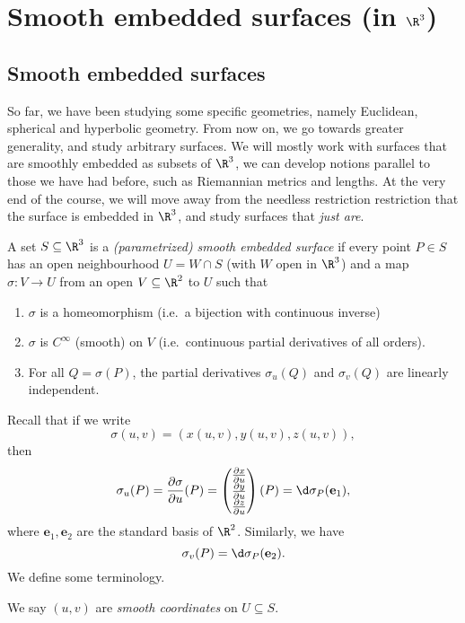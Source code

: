\documentclass[a4paper]{article}
\begin{document}
\section{Smooth embedded surfaces (in \texorpdfstring{$\R^3$}{R3})}
\subsection{Smooth embedded surfaces}
So far, we have been studying some specific geometries, namely Euclidean, spherical and hyperbolic geometry. From now on, we go towards greater generality, and study arbitrary surfaces. We will mostly work with surfaces that are smoothly embedded as subsets of $\R^3$, we can develop notions parallel to those we have had before, such as Riemannian metrics and lengths. At the very end of the course, we will move away from the needless restriction restriction that the surface is embedded in $\R^3$, and study surfaces that \emph{just are}.

\begin{defi}
  A set $S \subseteq \R^3$ is a \emph{(parametrized) smooth embedded surface} if every point $P \in S$ has an open neighbourhood $U = W \cap S$ (with $W$ open in $\R^3$) and a map $\sigma: V \to U$ from an open $V \subseteq \R^2$ to $U$ such that
  \begin{enumerate}
    \item $\sigma$ is a homeomorphism (i.e.\ a bijection with continuous inverse)
    \item $\sigma$ is $C^\infty$ (smooth) on $V$ (i.e.\ continuous partial derivatives of all orders).
    \item For all $Q = \sigma(P)$, the partial derivatives $\sigma_u(Q)$ and $\sigma_v(Q)$ are linearly independent.
  \end{enumerate}
\end{defi}
Recall that if we write
\[
  \sigma(u, v) = (x(u, v), y(u, v), z(u, v)),
\]
then
\[
  \sigma_u(P) = \frac{\partial \sigma}{\partial u}(P) =
  \begin{pmatrix}
    \frac{\partial x}{\partial u}\\
    \frac{\partial y}{\partial u}\\
    \frac{\partial z}{\partial u}
  \end{pmatrix}
  (P)
  = \d\sigma_P (\mathbf{e}_1),
\]
where $\mathbf{e}_1, \mathbf{e}_2$ are the standard basis of $\R^2$. Similarly, we have
\[
  \sigma_v(P) = \d \sigma_P(\mathbf{e}_2).
\]
We define some terminology.
\begin{defi}
  We say $(u, v)$ are \emph{smooth coordinates} on $U \subseteq S$.
\end{defi}
\end{document}
